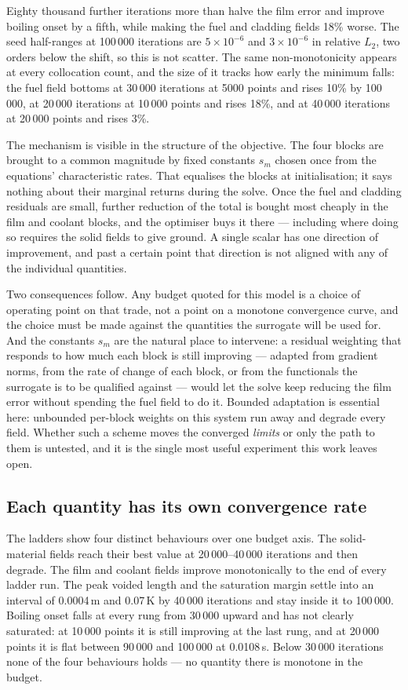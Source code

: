 \documentclass[11pt,a4paper]{article}
\begin{document}
Eighty thousand further iterations more than halve the film error and improve boiling onset
by a fifth, while making the fuel and cladding fields 18\% worse. The seed half-ranges at
100\,000 iterations are $5\times10^{-6}$ and $3\times10^{-6}$ in relative $L_2$, two orders
below the shift, so this is not scatter. The same non-monotonicity appears at every collocation count, and the size of it tracks how
early the minimum falls: the fuel field bottoms at 30\,000 iterations at 5000 points and
rises 10\% by 100\,000, at 20\,000 iterations at 10\,000 points and rises 18\%, and at
40\,000 iterations at 20\,000 points and rises 3\%.

The mechanism is visible in the structure of the objective. The four blocks are brought to a
common magnitude by fixed constants $s_m$ chosen once from the equations' characteristic
rates. That equalises the blocks at initialisation; it says nothing about their marginal
returns during the solve. Once the fuel and cladding residuals are small, further reduction
of the total is bought most cheaply in the film and coolant blocks, and the optimiser buys
it there --- including where doing so requires the solid fields to give ground. A single
scalar has one direction of improvement, and past a certain point that direction is not
aligned with any of the individual quantities.

Two consequences follow. Any budget quoted for this model is a choice of operating point on
that trade, not a point on a monotone convergence curve, and the choice must be made against
the quantities the surrogate will be used for. And the constants $s_m$ are the natural place
to intervene: a residual weighting that responds to how much each block is still improving
--- adapted from gradient norms, from the rate of change of each block, or from the
functionals the surrogate is to be qualified against --- would let the solve keep reducing
the film error without spending the fuel field to do it. Bounded adaptation is essential
here: unbounded per-block weights on this system run away and degrade every field. Whether
such a scheme moves the converged \emph{limits} or only the path to them is untested, and it
is the single most useful experiment this work leaves open.

\subsection{Each quantity has its own convergence rate}

The ladders show four distinct behaviours over one budget axis. The solid-material fields
reach their best value at 20\,000--40\,000 iterations and then degrade. The film and coolant
fields improve monotonically to the end of every ladder run. The peak voided length and the
saturation margin settle into an interval of 0.0004\,m and 0.07\,K by 40\,000 iterations and
stay inside it to 100\,000. Boiling onset falls at every rung from 30\,000 upward and has not clearly
saturated: at 10\,000 points it is still improving at the last rung, and at 20\,000 points it
is flat between 90\,000 and 100\,000 at 0.0108\,s. Below 30\,000 iterations none of the four
behaviours holds --- no quantity there is monotone in the budget.
\end{document}
